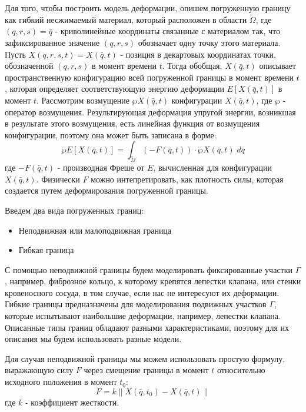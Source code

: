 Для того, чтобы построить модель деформации, опишем погруженную границу как
гибкий несжимаемый материал, который расположен в области $\tilde{\Omega}$, где
$(q, r, s) = \bar{q}$ - криволинейные координаты связанные с материалом так,
что зафиксированное значение $(q, r, s)$ обозначает одну точку этого материала.
Пусть $X(q, r, s, t) = X(\bar{q}, t)$ - позиция в декартовых координатах точки,
обозначенной $(q, r, s)$ в момент времени $t$. Тогда обобщая, $X(\bar{q}, t)$
описывает пространственную конфигурацию всей погруженной границы в момент
времени $t$, которая определяет соответствующую энергию деформации
$E[X(\bar{q}, t)]$ в момент $t$. Рассмотрим возмущение $\wp X(\bar{q}, t)$
конфигурации $X(\bar{q}, t)$, где $\wp$ - оператор возмущения.
Результирующая деформация упругой энергии, возникшая в результате этого
возмущения, есть линейная функция от возмущения конфигурации, поэтому она может
быть записана в форме: \begin{equation} \label{eq:elastic_energy_functional}
    \wp E[X(\bar{q}, t)] = \int_{\tilde{\Omega}} (-F(\bar{q}, t)) \cdot \wp
    X(\bar{q}, t)\; d\bar{q} \end{equation} где $-F(\bar{q}, t)$ - производная
Фреше от $E$, вычисленная для конфигурации $X(\bar{q}, t)$. Физически $F$ можно
интепретировать, как плотность силы, которая создается путем деформирования
погруженной границы.

Введем два вида погруженных границ:
\begin{itemize}
    \item Неподвижная или малоподвижная граница
    \item Гибкая граница 
\end{itemize}
С помощью неподвижной границы будем моделировать фиксированные участки
$\Gamma$, например, фиброзное кольцо, к которому крепятся лепестки клапана, или
стенки кровеносного сосуда, в том случае, если нас не интересуют их деформации.
Гибкие границы предназначены для моделирования подвижных участков $\Gamma$,
которые испытывают наибольшие деформации, например, лепестки клапана. Описанные
типы границ обладают разными характеристиками, поэтому для их описания мы будем
использовать разные модели.

Для случая неподвижной границы мы можем использовать простую формулу,
выражающую силу $F$ через смещение границы в момент $t$ относительно исходного
положения в момент $t_0$:
\begin{equation}
    \label{eq:simple_force}
    F = k \| X(\bar{q}, t_0) - X(\bar{q}, t) \|
\end{equation}
где $k$ - коэффициент жесткости.


